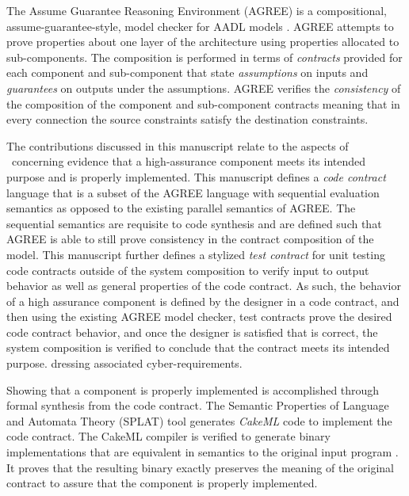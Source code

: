The Assume Guarantee Reasoning Environment (AGREE) is a compositional, assume-guarantee-style, model checker for AADL models \cite{compositional-analysis-agree,nfm:agree}. 
AGREE attempts to prove properties about one layer of the architecture using properties allocated to sub-components.
The composition is performed in terms of \emph{contracts} provided for each component and sub-component that state \emph{assumptions} on inputs and \emph{guarantees} on outputs under the assumptions.
AGREE verifies the \emph{consistency} of the composition of the component and sub-component contracts meaning that in every connection the source constraints satisfy the destination constraints.

The contributions discussed in this manuscript relate to the aspects of \brfcs\ concerning evidence that a high-assurance component meets its intended purpose and is properly implemented.
This manuscript defines a \emph{code contract} language that is a subset of the AGREE language with sequential evaluation semantics as opposed to the existing parallel semantics of AGREE.
The sequential semantics are requisite to code synthesis and are defined such that AGREE is able to still prove consistency in the contract composition of the model. 
This manuscript further defines a stylized \emph{test contract} for unit testing code contracts outside of the system composition to verify input to output behavior as well as general properties of the code contract.
As such, the behavior of a high assurance component is defined by the designer in a code contract, and then using the existing AGREE model checker, test contracts prove the desired code contract behavior, and once the designer is satisfied that is correct, the system composition is verified to conclude that the contract meets its intended purpose.
dressing associated cyber-requirements.

Showing that a component is properly implemented is accomplished through formal synthesis from the code contract.
The Semantic Properties of Language and Automata Theory (SPLAT) tool generates \emph{CakeML} code to implement the code contract.
The CakeML compiler is verified to generate binary implementations that are equivalent in semantics to the original input program \cite{cakeml}.
It proves that the resulting binary exactly preserves the meaning of the original contract to assure that the component is properly implemented.